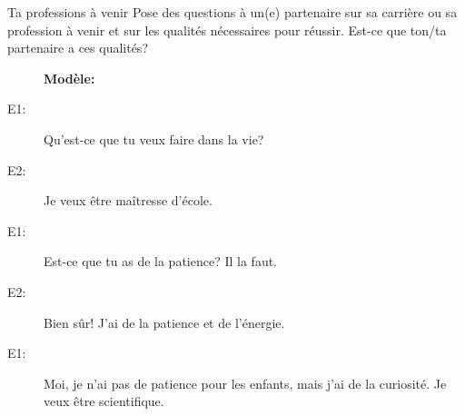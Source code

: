 \begin{frame}{Ta professions à venir}
  Pose des questions à un(e) partenaire sur sa carrière ou sa profession à venir  et sur les qualités nécessaires pour réussir.
  Est-ce que ton/ta partenaire a ces qualités?
  \begin{description}
    \item[] \textbf{Modèle:}
    \item[E1:] Qu'est-ce que tu veux faire dans la vie?
    \item[E2:] Je veux être maîtresse d'école.
    \item[E1:] Est-ce que tu as \alert{de la} patience? Il la faut.
    \item[E2:] Bien sûr! J'ai \alert{de la} patience et \alert{de l'}énergie.
    \item[E1:] Moi, je n'ai pas \alert{de} patience pour les enfants, mais j'ai \alert{de la curiosité}. Je veux être scientifique.
  \end{description}
\end{frame}